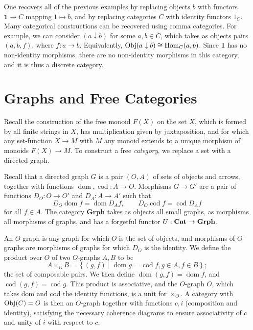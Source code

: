 One recovers all of the previous examples by replacing objects $b$ with functors $\mathbf{1} \to C$ mapping $1\mapsto b$, and by replacing categories $C$ with identity functors $1_C$. Many categorical constructions can be recovered using comma categories. For example, we can consider $(a\downarrow b)$ for some $a,b\in C$, which takes as objects pairs $(a,b,f)$, where $f : a \to b$. Equivalently, $\operatorname{Obj}(a\downarrow b) \cong \operatorname{Hom}_{C}(a, b) $. Since $\mathbf{1} $ has no non-identity morphisms, there are no non-identity morphisms in this category, and it is thus a discrete category.

\section{Graphs and Free Categories}

Recall the construction of the free monoid $F(X)$ on the set $X$, which is formed by all finite strings in $X$, has multiplication given by juxtaposition, and for which any set-function $X\to M$ with $M$ any monoid extends to a unique morphism of monoids $F(X)\to M$. To construct a free \emph{category}, we replace a set with a directed graph.

Recall that a directed graph $G$ is a pair $\left( O,A \right) $ of sets of objects and arrows, together with functions $\operatorname{dom} ,\operatorname{cod} : A \to O$. Morphisms $G\to G'$ are a pair of functions $D_O : O \to O'$ and $D_A : A \to A'$ such that
\[
	D_O \operatorname{dom} f = \operatorname{dom} D_A f,\qquad D_O \operatorname{cod} f=\operatorname{cod} D_A f
\]
for all $f\in A$. The category $\mathbf{Grph} $ takes as objects all small graphs, as morphisms all morphisms of graphs, and has a forgetful functor $U : \mathbf{Cat}  \to \mathbf{Grph} $.

An $O$-graph is any graph for which $O$ is the set of objects, and morphisms of $O$-graphs are morphisms of graphs for which $D_O$ is the identity. We define the product over $O$ of two $O$-graphs $A,B$ to be
\[
	A\times _OB=\left\{ (g,f)\mid \operatorname{dom} g=\operatorname{cod} f,g\in A,f\in B \right\} 
;\]
the set of composable pairs. We then define $\operatorname{dom} (g,f)=\operatorname{dom} f$, and $\operatorname{cod} (g,f)=\operatorname{cod} g$. This product is associative, and the $O$-graph $O$, which takes dom and cod the identity functions, is a unit for $\times _O$. A category with $\operatorname{Obj}(C) =O$ is then an $O$-graph together with functions $c,i$ (composition and identity), satisfying the necessary coherence diagrams to ensure associativity of $c$ and unity of $i$ with respect to $c$.

